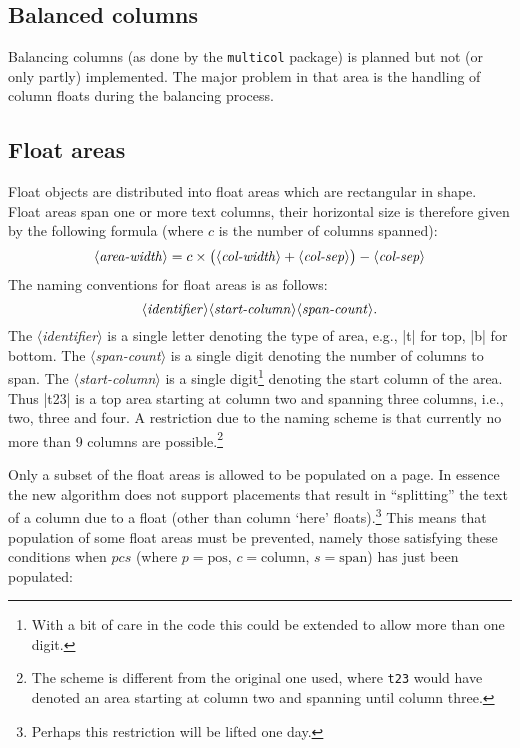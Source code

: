 \documentclass[twocolumn]{article}
\newcommand\meta[1]{\mbox{$\langle$\textit{#1}$\rangle$}}
\begin{document}
\subsection{Balanced columns}

Balancing columns (as done by the \texttt{multicol} package) is planned but
not (or only partly) implemented. The major problem in that area is the
handling of column floats during the balancing process.



\subsection{Float areas}\label{overlap}

Float objects are distributed into float areas which are
rectangular in shape. Float areas span one or more text columns, their
horizontal size is therefore given by the following formula (where
$c$ is the number of columns spanned):
\[
   \meta{area-width} =  c \times 
                        \bigl( \meta{col-width} + \meta{col-sep}\bigr)
                        - \meta{col-sep}
\]
The naming conventions for float areas is as follows:
\[
\meta{identifier}\meta{start-column}\meta{span-count}.
\]
The \meta{identifier} is a single letter denoting the type of area,
e.g., |t| for top, |b| for bottom. The \meta{span-count} is a single
digit denoting the number of columns to span. The
\meta{start-column} is a single digit\footnote{With a bit of care in
the code this could be extended to allow more than one digit.}
denoting the start column of the area. Thus |t23| is a top area
starting at column two and spanning three columns, i.e., two, three 
and four.
A restriction due to the naming scheme is that currently no more than
9 columns are possible.\footnote{The scheme is different from the
original one used, where \texttt{t23} would have denoted an area
starting at column two and spanning until column three.}

 \tracefloats

Only a subset of the float areas is allowed to be populated on a
page. In essence the new algorithm does not support placements
that result in ``splitting'' the text of a column due to a float (other
than column `here' floats).\footnote{Perhaps this restriction will be
lifted one day.} This means that population of some float areas
must be prevented, namely those satisfying these conditions
when $pcs$ (where $p=\textrm{pos}$, 
$c=\textrm{column}$, $s=\textrm{span}$) has just been populated:
\end{document}

